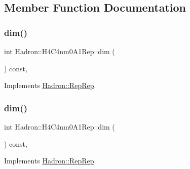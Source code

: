 \subsection{Member Function Documentation}
\mbox{\label{structHadron_1_1H4C4nm0A1Rep_af2f93214ff5002d0da3121eb9c254fb4}} 
\subsubsection{\texorpdfstring{dim()}{dim()}\hspace{0.1cm}{\footnotesize\ttfamily [1/5]}}
{\footnotesize\ttfamily int Hadron\+::\+H4\+C4nm0\+A1\+Rep\+::dim (\begin{DoxyParamCaption}{ }\end{DoxyParamCaption}) const\hspace{0.3cm}{\ttfamily [inline]}, {\ttfamily [virtual]}}



Implements \mbox{\hyperlink{structHadron_1_1RepRep_a92c8802e5ed7afd7da43ccfd5b7cd92b}{Hadron\+::\+Rep\+Rep}}.

\mbox{\label{structHadron_1_1H4C4nm0A1Rep_af2f93214ff5002d0da3121eb9c254fb4}} 
\subsubsection{\texorpdfstring{dim()}{dim()}\hspace{0.1cm}{\footnotesize\ttfamily [2/5]}}
{\footnotesize\ttfamily int Hadron\+::\+H4\+C4nm0\+A1\+Rep\+::dim (\begin{DoxyParamCaption}{ }\end{DoxyParamCaption}) const\hspace{0.3cm}{\ttfamily [inline]}, {\ttfamily [virtual]}}



Implements \mbox{\hyperlink{structHadron_1_1RepRep_a92c8802e5ed7afd7da43ccfd5b7cd92b}{Hadron\+::\+Rep\+Rep}}.

\mbox{\label{structHadron_1_1H4C4nm0A1Rep_af2f93214ff5002d0da3121eb9c254fb4}} 
